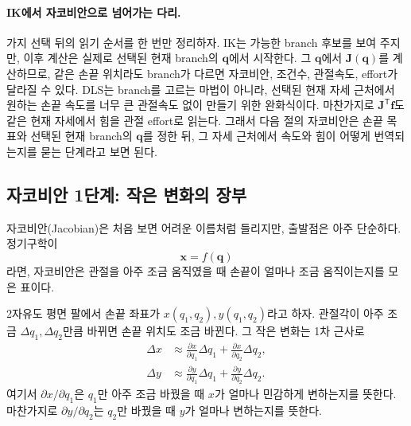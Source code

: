 \paragraph{IK에서 자코비안으로 넘어가는 다리.}
%
가지 선택 뒤의 읽기 순서를 한 번만 정리하자.
%
IK는 가능한 branch 후보를 보여 주지만, 이후 계산은 실제로 선택된 현재 branch의 \(\bm{q}\)에서 시작한다.
%
그 \(\bm{q}\)에서 \(\bm{J}(\bm{q})\)를 계산하므로, 같은 손끝 위치라도 branch가 다르면 자코비안, 조건수, 관절속도, effort가 달라질 수 있다.
%
%
DLS는 branch를 고르는 마법이 아니라, 선택된 현재 자세 근처에서 원하는 손끝 속도를 너무 큰 관절속도 없이 만들기 위한 완화식이다.
%
마찬가지로 \(\bm{J}^{\mathsf{T}}\bm{f}\)도 같은 현재 자세에서 힘을 관절 effort로 읽는다.
%
그래서 다음 절의 자코비안은 손끝 목표와 선택된 현재 branch의 \(\bm{q}\)를 정한 뒤, 그 자세 근처에서 속도와 힘이 어떻게 번역되는지를 묻는 단계라고 보면 된다.
%
%

\subsection{자코비안 1단계: 작은 변화의 장부}
\label{sec:robotics-jacobian-small-motion}

자코비안(Jacobian)은 처음 보면 어려운 이름처럼 들리지만, 출발점은 아주 단순하다.
정기구학이
\[
  \bm{x}=f(\bm{q})
\]
라면, 자코비안은 관절을 아주 조금 움직였을 때 손끝이 얼마나 조금 움직이는지를 모은 표이다.

2자유도 평면 팔에서 손끝 좌표가 \(x(q_1,q_2),y(q_1,q_2)\)라고 하자.
관절각이 아주 조금 \(\Delta q_1,\Delta q_2\)만큼 바뀌면 손끝 위치도 조금 바뀐다.
그 작은 변화는 1차 근사로
\begin{align}
  \Delta x
  &\approx
  \frac{\partial x}{\partial q_1}\Delta q_1
  +
  \frac{\partial x}{\partial q_2}\Delta q_2,
  \label{eq:jacobian-dx}
  \\
  \Delta y
  &\approx
  \frac{\partial y}{\partial q_1}\Delta q_1
  +
  \frac{\partial y}{\partial q_2}\Delta q_2.
  \label{eq:jacobian-dy}
\end{align}
여기서 \(\partial x/\partial q_1\)은 \(q_1\)만 아주 조금 바꿨을 때 \(x\)가 얼마나 민감하게 변하는지를 뜻한다.
마찬가지로 \(\partial y/\partial q_2\)는 \(q_2\)만 바꿨을 때 \(y\)가 얼마나 변하는지를 뜻한다.

